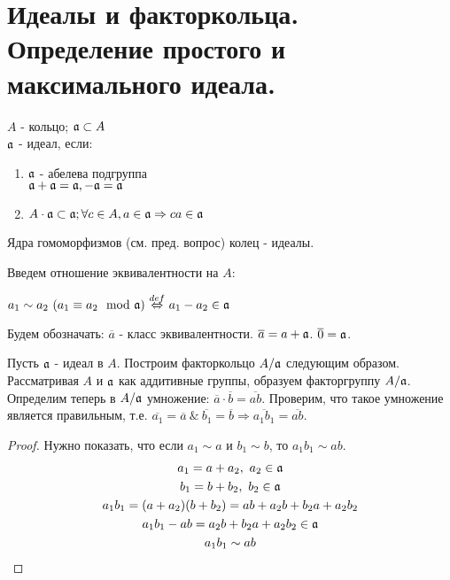\section{Идеалы и факторкольца. Определение простого и максимального идеала.}

\begin{defn}
$A$ - кольцо; $\mathfrak{a} \subset A$ \\
$\mathfrak{a}$ - идеал, если:
\begin{enumerate}
 \item $\mathfrak{a}$ - абелева подгруппа\\ $\mathfrak{a} + \mathfrak{a}= \mathfrak{a}, -\mathfrak{a} = \mathfrak{a}$
 \item $A \cdot \mathfrak{a} \subset \mathfrak{a}; \forall c \in A, a \in \mathfrak{a} \Rightarrow ca \in \mathfrak{a}$
\end{enumerate}

\end{defn}

Ядра гомоморфизмов (см. пред. вопрос) колец - идеалы.

Введем отношение эквивалентности на $A$:
\begin{center}
$a_1 \sim a_2 ~ (a_1 \equiv a_2 \mod \Id{a})~{\buildrel{def}\over{\Leftrightarrow}}~a_1 - a_2 \in \Id{a}$
\end{center}

Будем обозначать: $\overline{a}$ - класс эквивалентности. $\overline{a} = a + \mathfrak{a}$. $\overline{0} = \mathfrak{a}$.

Пусть $\mathfrak{a}$ - идеал в $A$. Построим факторкольцо $A/\mathfrak{a}$ следующим образом. Рассматривая $A$ и $\mathfrak{a}$ как аддитивные группы,
образуем факторгруппу $A/\mathfrak{a}$. Определим теперь в $A/\mathfrak{a}$ умножение: $\overline{a} \cdot \overline{b} = \overline{ab}$.
Проверим, что такое умножение является правильным, т.е. $\overline{a_1} = \overline{a}~\&~\overline{b_1} = \overline{b}
\Rightarrow \overline{a_1b_1} = \overline{ab}$.
\begin{proof}
Нужно показать, что если $a_1 \sim a$ и $b_1 \sim b$, то $a_1b_1 \sim ab$.
\begin{gather}
  a_1 = a + a_2, ~a_2 \in \mathfrak{a} \notag \\ \notag
  b_1 = b + b_2, ~b_2 \in \mathfrak{a} \\ \notag
  a_1b_1 = (a + a_2)(b + b_2) = ab + a_2b+b_2a+a_2b_2 \\ \notag
  a_1b_1 - ab = a_2b+b_2a+a_2b_2 \in \mathfrak{a} \\ \notag
  a_1b_1 \sim ab \notag
\end{gather}
\end{proof}

